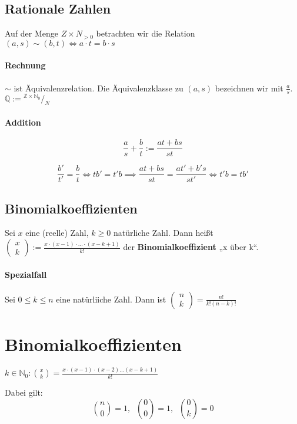 \documentclass[14pt,a4paper]{article}
\newcommand*\rfrac[2]{{}^{#1}\!/_{#2}}
\begin{document}
		\subsection{Rationale Zahlen}
			Auf der Menge $ Z \times N_{>0} $ betrachten wir die Relation $(a,s) \sim (b,t) \Leftrightarrow a \cdot t = b \cdot s $
			\paragraph{Rechnung} $\sim$ ist Äquivalenzrelation.
			Die Äquivalenzklasse zu $(a,s)$ bezeichnen wir mit $\frac{a}{s}$. \\
			$ \mathbb{Q} := \rfrac{\mathbb{Z} \times \mathbb{N}_0}{N}$
			\paragraph{Addition}
				$$ \frac{a}{s} + \frac{b}{t} := \frac{at + bs}{st} $$

				$$ \frac{b'}{t'} = \frac{b}{t} \Leftrightarrow t b' = t' b \implies \frac{at + bs}{st} = \frac{at' + b's}{s t'} \Leftrightarrow t'b = t b' $$

		\subsection{Binomialkoeffizienten}
			Sei $x$ eine (reelle) Zahl, $ k \geq 0 $ natürliche Zahl.
			Dann heißt $ \left(\!\begin{array}{c} x \\ k \end{array}\!\right) := \frac{x \cdot (x-1) \cdot \dots \cdot (x - k + 1)}{k!} $ der \textbf{Binomialkoeffizient} „x über k“.
			\paragraph{Spezialfall}
				Sei $ 0 \leq k \leq n $ eine natürliiche Zahl. Dann ist $ \left(\!\begin{array}{c} n \\ k \end{array}\!\right) = \frac{n!}{k!(n-k)!} $


	\setcounter{section}{2}
      \section{Binomialkoeffizienten}
   	   $ k \in \mathbb{N}_0 : \binom{x}{k} = \frac{x \cdot (x-1) \cdot (x-2) \dots (x-k+1)}{k!} $

   	   Dabei gilt:
   	   $$ \binom{n}{0} = 1 ,\;\; \binom{0}{0} = 1,\;\; \binom{0}{k} = 0 $$
\end{document}
